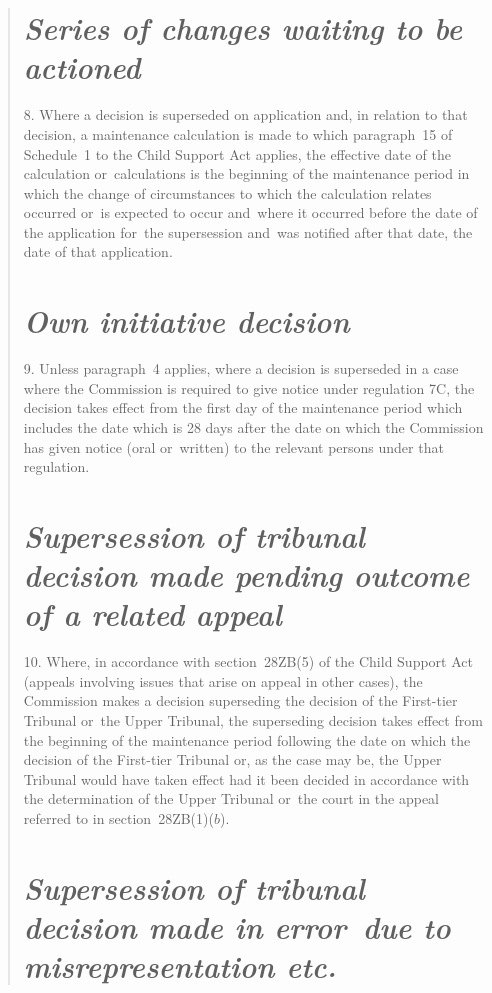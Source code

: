 \documentclass[12pt,a4paper]{article}
\begin{document}
\begin{quotation}
\section*{\itshape\sloppy Series of changes waiting to be actioned}

8.  Where a decision is superseded on application and, in relation to that decision, a maintenance calculation is made to which paragraph~15 of Schedule~1 to the Child Support Act applies, the effective date of the calculation or~calculations is the beginning of the maintenance period in which the change of circumstances to which the calculation relates occurred or~is expected to occur and~where it occurred before the date of the application for~the supersession and~was notified after that date, the date of that application.%

\section*{\itshape Own initiative decision}

9.  Unless paragraph~4 applies, where a decision is superseded in a case where the Commission is required to give notice under regulation 7C, the decision takes effect from the first day of the maintenance period which includes the date which is 28 days after the date on which the Commission has given notice (oral or~written) to the relevant persons under that regulation.

\section*{\itshape\sloppy{} Supersession of tribunal decision made pending outcome of a related appeal}

10.  Where, in accordance with section~28ZB(5) of the Child Support Act (appeals involving issues that arise on appeal in other cases), the Commission makes a decision superseding the decision of the First-tier Tribunal or~the Upper Tribunal, the superseding decision takes effect from the beginning of the maintenance period following the date on which the decision of the First-tier Tribunal or, as the case may be, the Upper Tribunal would have taken effect had it been decided in accordance with the determination of the Upper Tribunal or~the court in the appeal referred to in section~28ZB(1)($b$).

\section*{\itshape\sloppy{}  Supersession of tribunal decision made in error~due to misrepresentation etc.}


\end{quotation}
\end{document}

